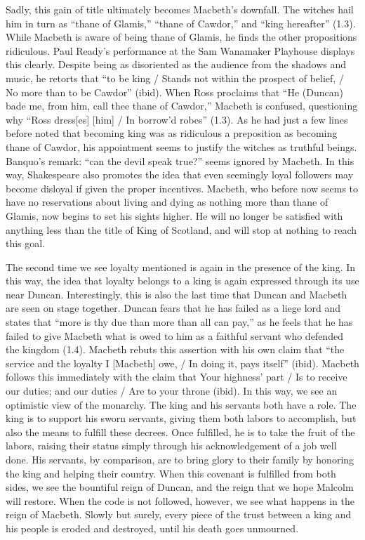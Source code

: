 \documentclass[12pt]{article}[titlepage]
\newcommand{\say}[1]{``#1''}
\newcommand{\1}{\={a}}
\newcommand{\2}{\={e}}
\newcommand{\3}{\={\i}}
\newcommand{\4}{\=o}
\newcommand{\5}{\=u}
\newcommand{\6}{\={A}}
\renewcommand{\,}{\textsuperscript{,}}
\begin{document}
Sadly, this gain of title ultimately becomes Macbeth's downfall.
The witches hail him in turn as \say{thane of Glamis,} \say{thane of Cawdor,} and \say{king hereafter} (1.3).
While Macbeth is aware of being thane of Glamis, he finds the other propositions ridiculous.
Paul Ready's performance at the Sam Wanamaker Playhouse displays this clearly.
Despite being as disoriented as the audience from the shadows and music, he retorts that \say{to be king / Stands not within the prospect of belief, / No more than to be Cawdor} (ibid).
When Ross proclaims that \say{He (Duncan) bade me, from him, call thee thane of Cawdor,} Macbeth is confused, questioning why \say{Ross dress[es] [him] / In borrow'd robes} (1.3).
As he had just a few lines before noted that becoming king was as ridiculous a preposition as becoming thane of Cawdor, his appointment seems to justify the witches as truthful beings.
Banquo's remark: \say{can the devil speak true?} seems ignored by Macbeth.
In this way, Shakespeare also promotes the idea that even seemingly loyal followers may become disloyal if given the proper incentives.
Macbeth, who before now seems to have no reservations about living and dying as nothing more than thane of Glamis, now begins to set his sights higher.
He will no longer be satisfied with anything less than the title of King of Scotland, and will stop at nothing to reach this goal.

The second time we see loyalty mentioned is again in the presence of the king.
In this way, the idea that loyalty belongs to a king is again expressed through its use near Duncan.
Interestingly, this is also the last time that Duncan and Macbeth are seen on stage together.
Duncan fears that he has failed as a liege lord and states that \say{more is thy due than more than all can pay,} as he feels that he has failed to give Macbeth what is owed to him as a faithful servant who defended the kingdom (1.4).
Macbeth rebuts this assertion with his own claim that \say{the service and the loyalty I [Macbeth] owe, / In doing it, pays itself} (ibid).
Macbeth follows this immediately with the claim that {Your highness' part / Is to receive our duties; and our duties / Are to your throne} (ibid).
In this way, we see an optimistic view of the monarchy.
The king and his servants both have a role.
The king is to support his sworn servants, giving them both labors to accomplish, but also the means to fulfill these decrees.
Once fulfilled, he is to take the fruit of the labors, raising their status simply through his acknowledgement of a job well done.
His servants, by comparison, are to bring glory to their family by honoring the king and helping their country.
When this covenant is fulfilled from both sides, we see the bountiful reign of Duncan, and the reign that we hope Malcolm will restore.
When the code is not followed, however, we see what happens in the reign of Macbeth.
Slowly but surely, every piece of the trust between a king and his people is eroded and destroyed, until his death goes unmourned.
\end{document}
